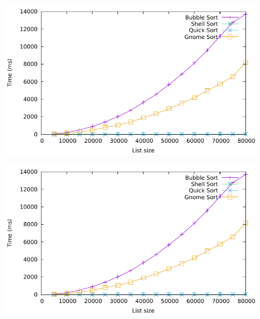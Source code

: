 %

\newsavebox{\sortplot}
\begin{lrbox}{\sortplot}
\href{P1.0}{\includegraphics[page=1,width=\linewidth]{labpal-plots.pdf}}
\end{lrbox}

\newsavebox{\sorthisto}
\begin{lrbox}{\sorthisto}
\href{P2.0}{\includegraphics[page=2,width=\linewidth]{labpal-plots.pdf}}
\end{lrbox}


